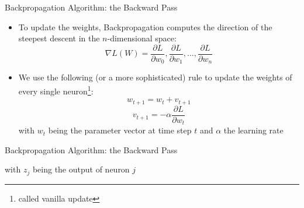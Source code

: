 \documentclass{beamer}
\begin{document}

\begin{frame}{Backpropagation Algorithm: the Backward Pass}
\begin{itemize}
\item To update the weights, Backpropagation computes the direction of the steepest descent in the $n$-dimensional space:
\begin{equation}
	\nabla L(W) = \frac{\partial L}{\partial w_0}, \frac{\partial L}{\partial w_1}, ..., \frac{\partial L}{\partial w_n}
\end{equation}
\item We use the following (or a more sophisticated) rule to update the weights of every single neuron\footnote{called vanilla update}:
\begin{equation}
w_{t+1} = w_t + v_{t+1}
\end{equation} 
\begin{equation}
v_{t+1} = - \alpha \frac{\partial L}{\partial w_t}
\end{equation}
with $w_t$ being the parameter vector at time step $t$ and $\alpha$ the learning rate
\end{itemize}
\end{frame}

\begin{frame}{Backpropagation Algorithm: the Backward Pass}
\begin{itemize}

with $z_j$ being the output of neuron $j$ 
\end{itemize}
\end{frame}
\end{document}
